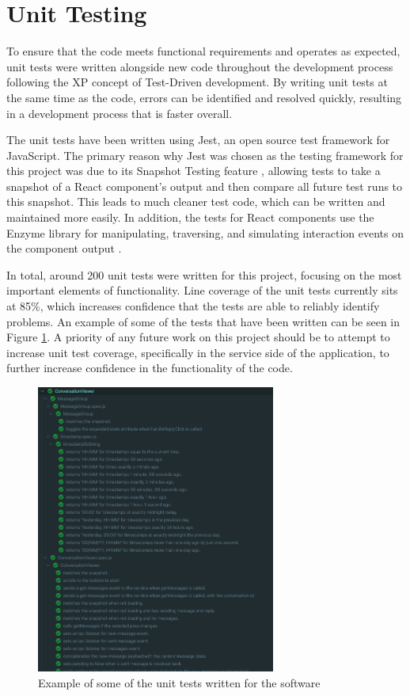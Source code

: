 \section{Unit Testing}
To ensure that the code meets functional requirements and operates as expected, unit tests were written alongside new code throughout the development process following the XP concept of Test-Driven development. By writing unit tests at the same time as the code, errors can be identified and resolved quickly, resulting in a development process that is faster overall.

The unit tests have been written using Jest, an open source test framework for JavaScript. The primary reason why Jest was chosen as the testing framework for this project was due to its Snapshot Testing feature \cite{jest-snapshot}, allowing tests to take a snapshot of a React component's output and then compare all future test runs to this snapshot. This leads to much cleaner test code, which can be written and maintained more easily. In addition, the tests for React components use the Enzyme library for manipulating, traversing, and simulating interaction events on the component output \cite{enzyme}. 

In total, around 200 unit tests were written for this project, focusing on the most important elements of functionality. Line coverage of the unit tests currently sits at 85\%, which increases confidence that the tests are able to reliably identify problems. An example of some of the tests that have been written can be seen in Figure \ref{fig:test-results}. A priority of any future work on this project should be to attempt to increase unit test coverage, specifically in the service side of the application, to further increase confidence in the functionality of the code.

\begin{figure}[h!]
  \centering
  \includegraphics[width=0.7\textwidth]{images/test-results2.png}
  \caption{Example of some of the unit tests written for the software}
  \label{fig:test-results}
\end{figure}

